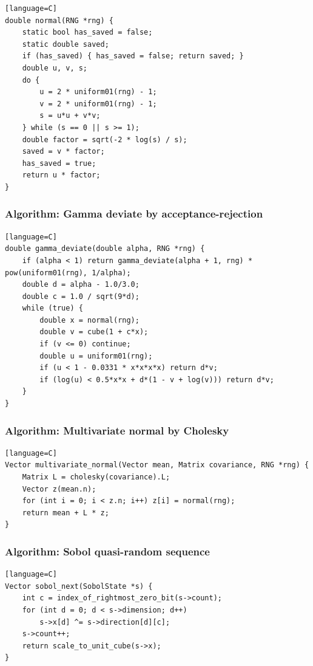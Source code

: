 \documentclass[11pt]{article}
\begin{document}
\begin{verbatim}[language=C]
double normal(RNG *rng) {
    static bool has_saved = false;
    static double saved;
    if (has_saved) { has_saved = false; return saved; }
    double u, v, s;
    do {
        u = 2 * uniform01(rng) - 1;
        v = 2 * uniform01(rng) - 1;
        s = u*u + v*v;
    } while (s == 0 || s >= 1);
    double factor = sqrt(-2 * log(s) / s);
    saved = v * factor;
    has_saved = true;
    return u * factor;
}
\end{verbatim}

\subsubsection{Algorithm: Gamma deviate by acceptance-rejection}\label{algorithm-gamma-deviate-by-acceptance-rejection}

\begin{verbatim}[language=C]
double gamma_deviate(double alpha, RNG *rng) {
    if (alpha < 1) return gamma_deviate(alpha + 1, rng) * pow(uniform01(rng), 1/alpha);
    double d = alpha - 1.0/3.0;
    double c = 1.0 / sqrt(9*d);
    while (true) {
        double x = normal(rng);
        double v = cube(1 + c*x);
        if (v <= 0) continue;
        double u = uniform01(rng);
        if (u < 1 - 0.0331 * x*x*x*x) return d*v;
        if (log(u) < 0.5*x*x + d*(1 - v + log(v))) return d*v;
    }
}
\end{verbatim}

\subsubsection{Algorithm: Multivariate normal by Cholesky}\label{algorithm-multivariate-normal-by-cholesky}

\begin{verbatim}[language=C]
Vector multivariate_normal(Vector mean, Matrix covariance, RNG *rng) {
    Matrix L = cholesky(covariance).L;
    Vector z(mean.n);
    for (int i = 0; i < z.n; i++) z[i] = normal(rng);
    return mean + L * z;
}
\end{verbatim}

\subsubsection{Algorithm: Sobol quasi-random sequence}\label{algorithm-sobol-quasi-random-sequence}

\begin{verbatim}[language=C]
Vector sobol_next(SobolState *s) {
    int c = index_of_rightmost_zero_bit(s->count);
    for (int d = 0; d < s->dimension; d++)
        s->x[d] ^= s->direction[d][c];
    s->count++;
    return scale_to_unit_cube(s->x);
}
\end{verbatim}
\end{document}
